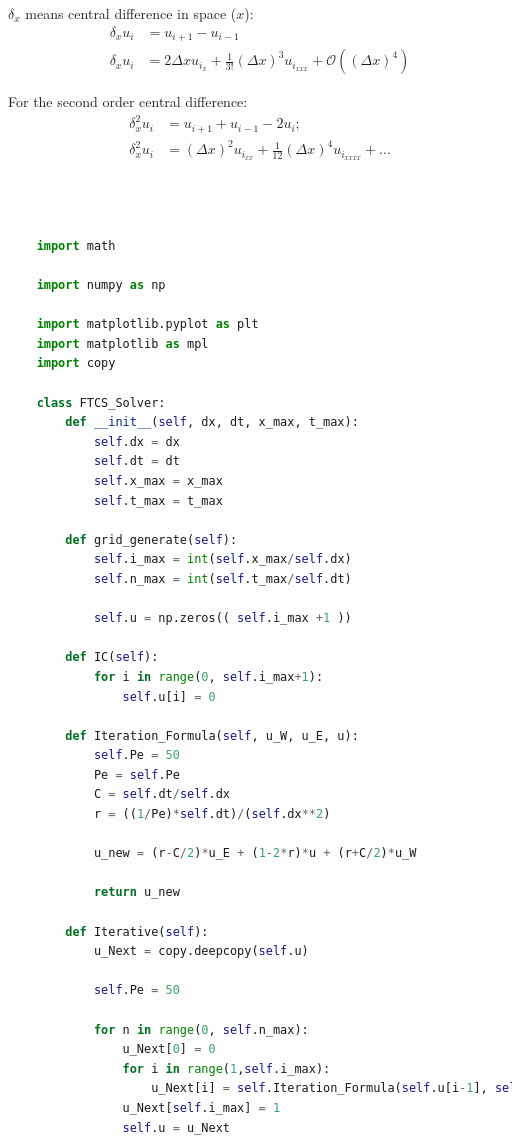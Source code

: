 \documentclass[12pt]{article}
\begin{document}
\begin{scriptsize}
    \(\delta_x\) means central difference in space (\(x\)):
    \begin{align*}
        \delta_x u_i &= u_{i+1} - u_{i-1} \\
        \delta_x u_i &= 2\Delta x u_{i_x} + \frac{1}{3!}(\Delta x)^3 u_{i_{xxx}} + \mathcal{O}((\Delta x)^4)
    \end{align*}
    
    For the second order central difference:
    \begin{align*}
        \delta_x^2 u_i &= u_{i+1} + u_{i-1} - 2u_i; \\
        \delta_x^2 u_i &= (\Delta x)^2 u_{i_{xx}} + \frac{1}{12}(\Delta x)^4 u_{i_{xxxx}} + \ldots
    \end{align*}
    

\begin{lstlisting}[language=python,caption={Problem1, Py code for FTCS Solver}]



    import math

    import numpy as np
    
    import matplotlib.pyplot as plt
    import matplotlib as mpl
    import copy
    
    class FTCS_Solver:
        def __init__(self, dx, dt, x_max, t_max):
            self.dx = dx
            self.dt = dt
            self.x_max = x_max
            self.t_max = t_max
    
        def grid_generate(self):
            self.i_max = int(self.x_max/self.dx)
            self.n_max = int(self.t_max/self.dt)
    
            self.u = np.zeros(( self.i_max +1 ))
    
        def IC(self):
            for i in range(0, self.i_max+1):
                self.u[i] = 0
    
        def Iteration_Formula(self, u_W, u_E, u):
            self.Pe = 50
            Pe = self.Pe
            C = self.dt/self.dx
            r = ((1/Pe)*self.dt)/(self.dx**2)
    
            u_new = (r-C/2)*u_E + (1-2*r)*u + (r+C/2)*u_W
    
            return u_new
    
        def Iterative(self):
            u_Next = copy.deepcopy(self.u)
            
            self.Pe = 50
    
            for n in range(0, self.n_max):
                u_Next[0] = 0
                for i in range(1,self.i_max):
                    u_Next[i] = self.Iteration_Formula(self.u[i-1], self.u[i+1], self.u[i])
                u_Next[self.i_max] = 1
                self.u = u_Next
    

\end{lstlisting}
\end{scriptsize}
\end{document}
